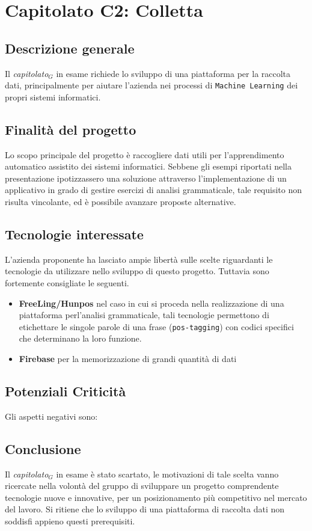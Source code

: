 \chapter{Capitolato C2: Colletta}
\section{Descrizione generale}
Il \textit{capitolato$_{G}$} in esame richiede lo sviluppo di una piattaforma per la raccolta dati, principalmente per aiutare l'azienda nei processi di \texttt{Machine Learning} dei propri sistemi informatici.

\section{Finalit\`a del progetto}
Lo scopo principale del progetto è raccogliere dati utili per l'apprendimento automatico assistito dei sistemi informatici. Sebbene gli esempi riportati nella presentazione ipotizzassero una soluzione attraverso l'implementazione di un applicativo in grado di gestire esercizi di analisi grammaticale, tale requisito non risulta vincolante, ed è possibile avanzare proposte alternative.

\section{Tecnologie interessate}
L'azienda proponente ha lasciato ampie libertà sulle scelte riguardanti le tecnologie da utilizzare nello sviluppo di questo progetto. Tuttavia sono fortemente consigliate le seguenti.
\begin{itemize}
	\item \textbf{FreeLing/Hunpos} nel caso in cui si proceda nella realizzazione di una piattaforma perl'analisi grammaticale, tali tecnologie permettono di etichettare le singole parole di una frase (\texttt{pos-tagging}) con codici specifici che determinano la loro funzione.
	\item \textbf{Firebase} per la memorizzazione di grandi quantità di dati
\end{itemize}
\section{Potenziali Criticità}
Gli aspetti negativi sono:
\section{Conclusione}
Il \textit{capitolato$_{G}$} in esame è stato scartato, le motivazioni di tale scelta vanno ricercate nella volontà del gruppo di sviluppare un progetto comprendente tecnologie nuove e innovative, per un posizionamento più competitivo nel mercato del lavoro. Si ritiene che lo sviluppo di una piattaforma di raccolta dati non soddisfi appieno questi prerequisiti. 